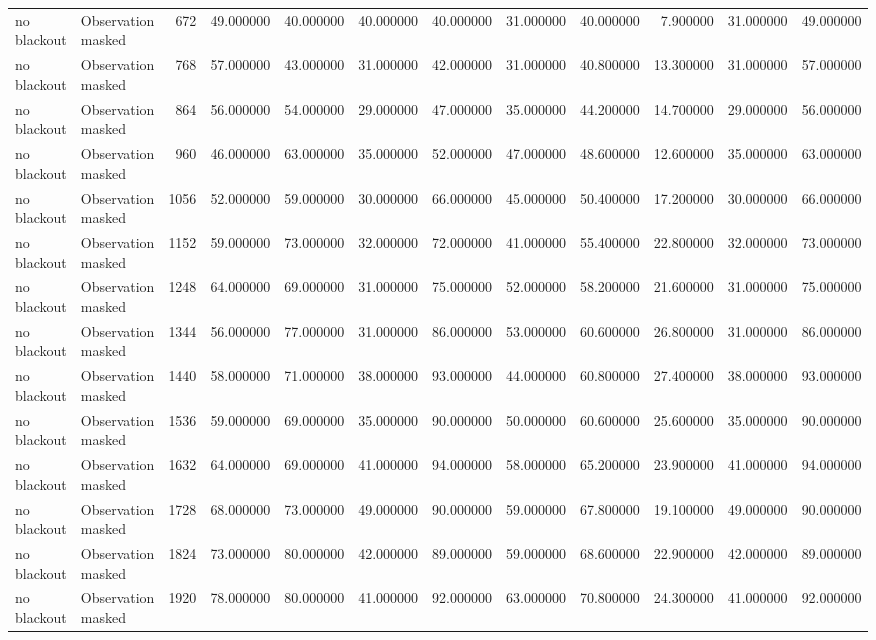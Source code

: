 \begin{tabular}{llrrrrrrrrrr}
no blackout & Observation masked & 672 & 49.000000 & 40.000000 & 40.000000 & 40.000000 & 31.000000 & 40.000000 & 7.900000 & 31.000000 & 49.000000 \\
no blackout & Observation masked & 768 & 57.000000 & 43.000000 & 31.000000 & 42.000000 & 31.000000 & 40.800000 & 13.300000 & 31.000000 & 57.000000 \\
no blackout & Observation masked & 864 & 56.000000 & 54.000000 & 29.000000 & 47.000000 & 35.000000 & 44.200000 & 14.700000 & 29.000000 & 56.000000 \\
no blackout & Observation masked & 960 & 46.000000 & 63.000000 & 35.000000 & 52.000000 & 47.000000 & 48.600000 & 12.600000 & 35.000000 & 63.000000 \\
no blackout & Observation masked & 1056 & 52.000000 & 59.000000 & 30.000000 & 66.000000 & 45.000000 & 50.400000 & 17.200000 & 30.000000 & 66.000000 \\
no blackout & Observation masked & 1152 & 59.000000 & 73.000000 & 32.000000 & 72.000000 & 41.000000 & 55.400000 & 22.800000 & 32.000000 & 73.000000 \\
no blackout & Observation masked & 1248 & 64.000000 & 69.000000 & 31.000000 & 75.000000 & 52.000000 & 58.200000 & 21.600000 & 31.000000 & 75.000000 \\
no blackout & Observation masked & 1344 & 56.000000 & 77.000000 & 31.000000 & 86.000000 & 53.000000 & 60.600000 & 26.800000 & 31.000000 & 86.000000 \\
no blackout & Observation masked & 1440 & 58.000000 & 71.000000 & 38.000000 & 93.000000 & 44.000000 & 60.800000 & 27.400000 & 38.000000 & 93.000000 \\
no blackout & Observation masked & 1536 & 59.000000 & 69.000000 & 35.000000 & 90.000000 & 50.000000 & 60.600000 & 25.600000 & 35.000000 & 90.000000 \\
no blackout & Observation masked & 1632 & 64.000000 & 69.000000 & 41.000000 & 94.000000 & 58.000000 & 65.200000 & 23.900000 & 41.000000 & 94.000000 \\
no blackout & Observation masked & 1728 & 68.000000 & 73.000000 & 49.000000 & 90.000000 & 59.000000 & 67.800000 & 19.100000 & 49.000000 & 90.000000 \\
no blackout & Observation masked & 1824 & 73.000000 & 80.000000 & 42.000000 & 89.000000 & 59.000000 & 68.600000 & 22.900000 & 42.000000 & 89.000000 \\
no blackout & Observation masked & 1920 & 78.000000 & 80.000000 & 41.000000 & 92.000000 & 63.000000 & 70.800000 & 24.300000 & 41.000000 & 92.000000 \\

\end{tabular}
